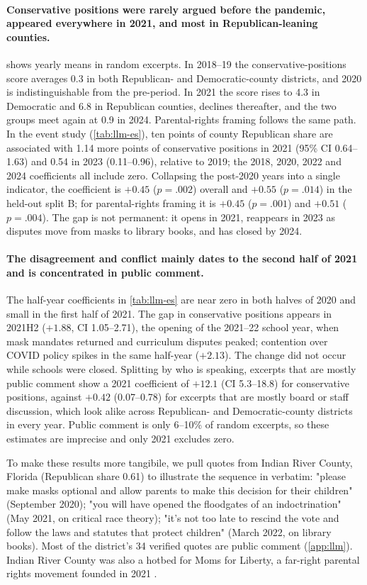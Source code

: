 \documentclass[12pt]{article}
\begin{document}
\paragraph{Conservative positions were rarely argued before the pandemic, appeared everywhere in 2021, and most in Republican-leaning counties.}
 shows yearly means in random excerpts. In 2018--19 the conservative-positions score averages 0.3 in both Republican- and Democratic-county districts, and 2020 is indistinguishable from the pre-period. In 2021 the score rises to 4.3 in Democratic and 6.8 in Republican counties, declines thereafter, and the two groups meet again at 0.9 in 2024. Parental-rights framing follows the same path. In the event study (\cref{tab:llm-es}), ten points of county Republican share are associated with 1.14 more points of conservative positions in 2021 (95\% CI 0.64--1.63) and 0.54 in 2023 (0.11--0.96), relative to 2019; the 2018, 2020, 2022 and 2024 coefficients all include zero. Collapsing the post-2020 years into a single indicator, the coefficient is $+0.45$ ($p=.002$) overall and $+0.55$ ($p=.014$) in the held-out split B; for parental-rights framing it is $+0.45$ ($p=.001$) and $+0.51$ ($p=.004$). The gap is not permanent: it opens in 2021, reappears in 2023 as disputes move from masks to library books, and has closed by 2024.

\paragraph{The disagreement and conflict mainly dates to the second half of 2021 and is concentrated in public comment.}
The half-year coefficients in \cref{tab:llm-es} are near zero in both halves of 2020 and small in the first half of 2021. The gap in conservative positions appears in 2021H2 ($+1.88$, CI 1.05--2.71), the opening of the 2021--22 school year, when mask mandates returned and curriculum disputes peaked; contention over COVID policy spikes in the same half-year ($+2.13$). The change did not occur while schools were closed. Splitting by who is speaking, excerpts that are mostly public comment show a 2021 coefficient of $+12.1$ (CI 5.3--18.8) for conservative positions, against $+0.42$ (0.07--0.78) for excerpts that are mostly board or staff discussion, which look alike across Republican- and Democratic-county districts in every year. Public comment is only 6--10\% of random excerpts, so these estimates are imprecise and only 2021 excludes zero. 

To make these results more tangibile, we pull quotes from Indian River County, Florida (Republican share 0.61) to illustrate the sequence in verbatim: "please make masks optional and allow parents to make this decision for their children" (September 2020); "you will have opened the floodgates of an indoctrination" (May 2021, on critical race theory); "it's not too late to rescind the vote and follow the laws and statutes that protect children" (March 2022, on library books). Most of the district's 34 verified quotes are public comment (\cref{app:llm}). Indian River County was also a hotbed for Moms for Liberty, a far-right parental rights movement founded in 2021 \citep{splc_moms_2023}.  
\end{document}
